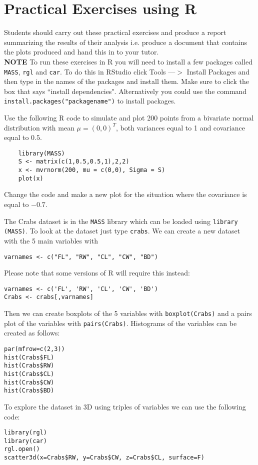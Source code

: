 \documentclass[answers]{exam}
\begin{document}
\section*{Practical Exercises using R}
Students should carry out these practical exercises and produce a report summarizing the results of their analysis i.e. produce a document that contains the plots produced and hand this in to your tutor.\\
\textbf{NOTE} To run these exercises in R you will need to install a few packages called \texttt{MASS}, \texttt{rgl} and \texttt{car}. To do this in RStudio click Tools ---$>$ Install Packages and then type in the names of the packages and install them. Make sure to click the box that says ``install dependencies". Alternatively you could use the command \texttt{install.packages("packagename")} to install packages.

\begin{questions}
\question%
Use the following R code to simulate and plot 200 points from a bivariate normal distribution with mean $\mu=(0,0)^{T}$, both variances equal to 1 and covariance equal to $0.5$. \begin{verbatim}
	library(MASS)
	S <- matrix(c(1,0.5,0.5,1),2,2)
	x <- mvrnorm(200, mu = c(0,0), Sigma = S)
	plot(x)
\end{verbatim} Change the code and make a new plot for the situation where the covariance is equal to $-0.7$.



\question%
The Crabs dataset is in the \texttt{MASS} library which can be loaded using \verb|library (MASS)|. To look at the dataset just type \verb|crabs|. We can create a new dataset with the 5 main variables with \begin{verbatim}
varnames <- c("FL", "RW", "CL", "CW", "BD")
\end{verbatim} Please note that some versions of $\mathrm{R}$ will require this instead: \begin{verbatim}
varnames <- c('FL', 'RW', 'CL', 'CW', 'BD')
Crabs <- crabs[,varnames]
\end{verbatim} Then we can create boxplots of the 5 variables with \verb|boxplot(Crabs)| and a pairs plot of the variables with \verb|pairs(Crabs)|. Histograms of the variables can be created as follows: \begin{verbatim}
par(mfrow=c(2,3))
hist(Crabs$FL)
hist(Crabs$RW)
hist(Crabs$CL)
hist(Crabs$CW)
hist(Crabs$BD)
\end{verbatim} To explore the dataset in 3D using triples of variables we can use the following code: \begin{verbatim}
library(rgl)
library(car)
rgl.open()
scatter3d(x=Crabs$RW, y=Crabs$CW, z=Crabs$CL, surface=F)
\end{verbatim}
\end{questions}
\end{document}
